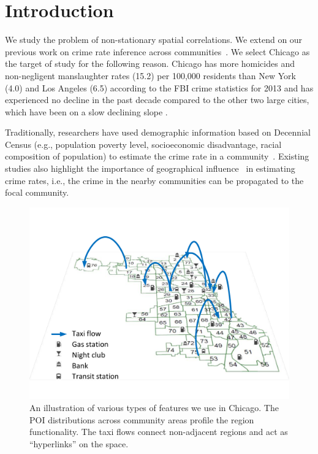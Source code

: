 
\section{Introduction}


We study the problem of non-stationary spatial correlations. We extend on our previous work on crime rate inference across communities~\cite{WKGL16}. We select Chicago as the target of study for the following reason. Chicago has more homicides and non-negligent manslaughter rates (15.2) per 100,000 residents than New York (4.0) and Los Angeles (6.5) according to the FBI crime statistics for 2013 and has experienced no decline in the past decade compared to the other two large cities, which have been on a slow declining slope \cite{crime-stats}.


Traditionally, researchers have used demographic information based on Decennial Census (e.g., population poverty level, socioeconomic disadvantage, racial composition of population) to estimate the crime rate in a community~\cite{GrSa09}. Existing studies also highlight the importance of geographical influence~\cite{Ans02} in estimating crime rates, i.e., the crime in the nearby communities can be propagated to the focal community.
 
\begin{figure}[t]
\centering
\includegraphics[width=0.8\linewidth]{fig/demo-kdd16.pdf}
\caption{An illustration of various types of features we use in Chicago. The POI distributions across community areas profile the region functionality. The taxi flows connect non-adjacent regions and act as ``hyperlinks'' on the space.}
\label{fig:demo}
\vspace{-3mm}
\end{figure}

